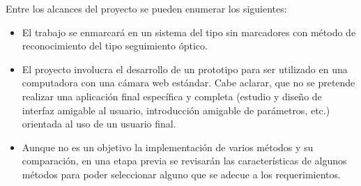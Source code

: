 Entre los alcances del proyecto se pueden enumerar los siguientes:
\begin{itemize}
  \item El trabajo se enmarcará en un sistema del tipo sin marcadores con método de reconocimiento del tipo seguimiento óptico.
  \item El proyecto involucra el desarrollo de un prototipo para ser utilizado en una computadora con una cámara web estándar. Cabe aclarar, que no se pretende realizar una aplicación final específica y completa (estudio y diseño de interfaz amigable al usuario, introducción amigable de parámetros, etc.) orientada al uso de un usuario final.
  \item Aunque no es un objetivo la implementación de varios métodos y su comparación, en una etapa previa se revisarán las características de algunos métodos para poder seleccionar alguno que se adecue a los requerimientos.
\end{itemize}